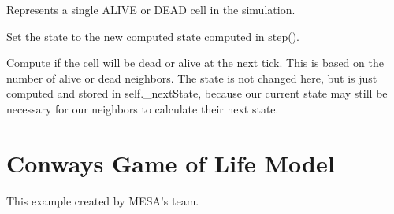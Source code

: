 \documentclass[letterpaper,10pt,english]{sphinxmanual}
\begin{document}
\begin{fulllineitems}
\label{\detokenize{index:examples.conways_game_of_life.conways_game_of_life.cell.Cell}}
Represents a single ALIVE or DEAD cell in the simulation.

\begin{fulllineitems}
\label{\detokenize{index:examples.conways_game_of_life.conways_game_of_life.cell.Cell.advance}}
Set the state to the new computed state \textendash{} computed in step().

\end{fulllineitems}


\begin{fulllineitems}
\label{\detokenize{index:examples.conways_game_of_life.conways_game_of_life.cell.Cell.step}}
Compute if the cell will be dead or alive at the next tick.  This is
based on the number of alive or dead neighbors.  The state is not
changed here, but is just computed and stored in self.\_nextState,
because our current state may still be necessary for our neighbors
to calculate their next state.

\end{fulllineitems}


\end{fulllineitems}

\label{\detokenize{index:module-examples.conways_game_of_life.conways_game_of_life.model}}

\chapter{Conways Game of Life Model}
\label{\detokenize{index:conways-game-of-life-model}}
This example created by MESA’s team.
\end{document}
